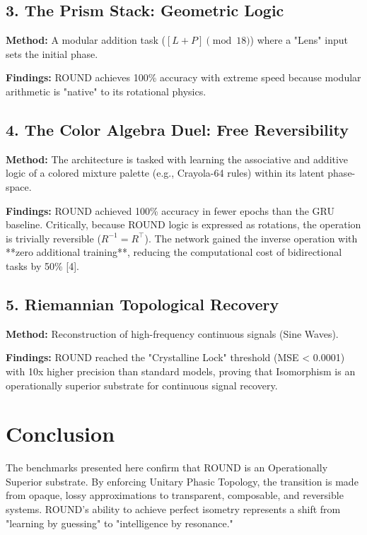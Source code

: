 \documentclass[11pt]{article}
\begin{document}
\subsection{3. The Prism Stack: Geometric Logic}

\textbf{Method:} A modular addition task ($[L + P] \pmod{18}$) where a "Lens" input sets the initial phase.

\textbf{Findings:} ROUND achieves 100\% accuracy with extreme speed because modular arithmetic is "native" to its rotational physics.

\subsection{4. The Color Algebra Duel: Free Reversibility}

\textbf{Method:} The architecture is tasked with learning the associative and additive logic of a colored mixture palette (e.g., Crayola-64 rules) within its latent phase-space.

\textbf{Findings:} ROUND achieved 100\% accuracy in fewer epochs than the GRU baseline. Critically, because ROUND logic is expressed as rotations, the operation is trivially reversible ($R^{-1} = R^{\top}$). The network gained the inverse operation with **zero additional training**, reducing the computational cost of bidirectional tasks by 50\% [4].

\subsection{5. Riemannian Topological Recovery}

\textbf{Method:} Reconstruction of high-frequency continuous signals (Sine Waves).

\textbf{Findings:} ROUND reached the "Crystalline Lock" threshold (MSE < 0.0001) with 10x higher precision than standard models, proving that Isomorphism is an operationally superior substrate for continuous signal recovery.

\section{Conclusion}

The benchmarks presented here confirm that ROUND is an Operationally Superior substrate. By enforcing Unitary Phasic Topology, the transition is made from opaque, lossy approximations to transparent, composable, and reversible systems. ROUND’s ability to achieve perfect isometry represents a shift from "learning by guessing" to "intelligence by resonance."
\end{document}
